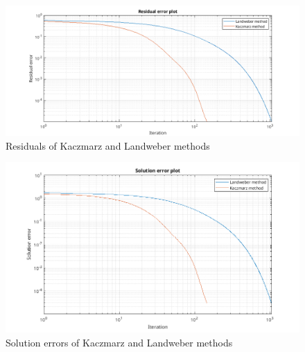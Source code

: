   \begin{figure}[H]
    \centering
    \includegraphics[width=1\textwidth]{images/Residuals_Problem2.png}
    \caption{Residuals of Kaczmarz and Landweber methods}
\end{figure}
\begin{figure}[H]
  \centering
  \includegraphics[width=1\textwidth]{images/Solution_Problem2.png}
  \caption{Solution errors of Kaczmarz and Landweber methods}
\end{figure}
